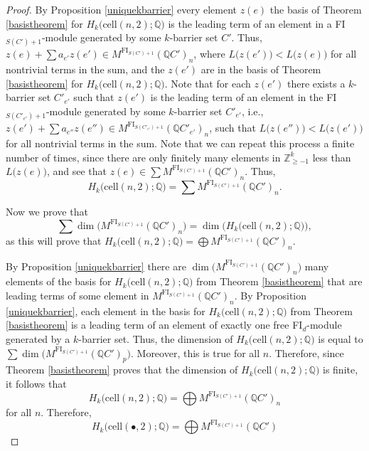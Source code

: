 \documentclass[12py]{amsart}%
\theoremstyle{definition}\newtheorem{definition}[thm]{Definition}
\theoremstyle{definition}
\newcommand{\Z}{\ensuremath{\mathbb{Z}}}
\newcommand{\Q}{\ensuremath{\mathbb{Q}}}
\begin{document}
\begin{proof}
By Proposition \ref{uniquekbarrier} every element $z(e)$ the basis of Theorem \ref{basistheorem} for $H_{k}\big(\text{cell}(n,2);\Q\big)$ is the leading term of an element in a FI$_{S(C')+1}$-module generated by some $k$-barrier set $C'$. Thus, $z(e)+\sum a_{e'}z(e')\in M^{\text{FI}_{S(C')+1}}(\Q C')_{n}$, where $L\big(z(e')\big)<L\big(z(e)\big)$ for all nontrivial terms in the sum, and the $z(e')$ are in the basis of Theorem \ref{basistheorem} for $H_{k}\big(\text{cell}(n,2);\Q\big)$. Note that for each $z(e')$ there exists a $k$-barrier set $C'_{e'}$ such that $z(e')$ is the leading term of an element in the FI$_{S(C'_{e'})+1}$-module generated by some $k$-barrier set $C'_{e'}$, i.e., $z(e')+\sum a_{e''}z(e'')\in M^{\text{FI}_{S(C'_{e'})+1}}(\Q C'_{e'})_{n}$, such that $L\big(z(e'')\big)<L\big(z(e')\big)$ for all nontrivial terms in the sum. Note that we can repeat this process a finite number of times, since there are only finitely many elements in $\Z_{\ge -1}^{k}$ less than $L\big(z(e)\big)$, and see that $z(e)\in \sum M^{\text{FI}_{S(C')+1}}(\Q C')_{n}$. Thus, 
\[
H_{k}\big(\text{cell}(n,2);\Q\big)=\sum M^{\text{FI}_{S(C')+1}}(\Q C')_{n}.
\]

Now we prove that 
\[
\sum \dim\big(M^{\text{FI}_{S(C')+1}}(\Q C')_{n}\big)=\dim\Big(H_{k}\big(\text{cell}(n,2);\Q\big)\Big),
\]
as this will prove that $H_{k}\big(\text{cell}(n,2);\Q\big)=\bigoplus M^{\text{FI}_{S(C')+1}}(\Q C')_{n}$. 

By Proposition \ref{uniquekbarrier} there are $\dim\big(M^{\text{FI}_{S(C')+1}}(\Q C')_{n}\big)$ many elements of the basis for $H_{k}\big(\text{cell}(n,2);\Q\big)$ from Theorem \ref{basistheorem} that are leading terms of some element in $M^{\text{FI}_{S(C')+1}}(\Q C')_{n}$. By Proposition \ref{uniquekbarrier}, each element in the basis for $H_{k}\big(\text{cell}(n,2);\Q\big)$ from Theorem \ref{basistheorem} is a leading term of an element of exactly one free FI$_{d}$-module generated by a $k$-barrier set. Thus, the dimension of $H_{k}\big(\text{cell}(n,2);\Q\big)$ is equal to $\sum \dim\big(M^{\text{FI}_{S(C')+1}}(\Q C')_{p}\big)$. Moreover, this is true for all $n$. Therefore, since Theorem \ref{basistheorem} proves that the dimension of $H_{k}\big(\text{cell}(n,2);\Q\big)$ is finite, it follows that 
\[
H_{k}\big(\text{cell}(n,2);\Q\big)=\bigoplus M^{\text{FI}_{S(C')+1}}(\Q C')_{n}
\]
for all $n$. Therefore,
\[
H_{k}\big(\text{cell}(\bullet,2);\Q\big)=\bigoplus M^{\text{FI}_{S(C')+1}}(\Q C')
\]

\end{proof}
\end{document}
